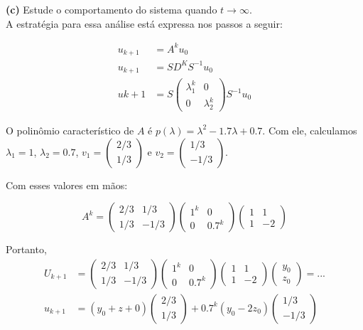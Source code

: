 \documentclass[12pt]{article}
\begin{document}
\textbf{(c)} Estude o comportamento do sistema quando $t\to \infty$.\\

A estratégia para essa análise está expressa nos passos a seguir:

\begin{align*}
	u_{k+1}&=A^ku_0\\
	u_{k+1}&=SD^{K}S^{-1}u_0\\
	u{k+1}&=S\begin{pmatrix}
		\lambda_1^k & 0 \\
		0 & \lambda_2^k
	\end{pmatrix}S^{-1}u_0
\end{align*}

O polinômio característico de $A$ é $p(\lambda)=\lambda^2-1.7\lambda+0.7$. Com ele, calculamos $\lambda_1=1$, $\lambda_2=0.7$, $v_1=\begin{pmatrix}
	2/3 \\
	1/3
\end{pmatrix}$ e $v_2=\begin{pmatrix}
	1/3 \\
	-1/3
\end{pmatrix}$.

Com esses valores em mãos:

\begin{equation*}
	A^k=\begin{pmatrix}
		2/3 & 1/3 \\
		1/3 & -1/3
	\end{pmatrix}
	\begin{pmatrix}
		1^k & 0 \\
		0 & 0.7^k
	\end{pmatrix}
	\begin{pmatrix}
		1 & 1 \\
		1 & -2
	\end{pmatrix}	
\end{equation*}

Portanto,
\begin{align*}
	U_{k+1}&=\begin{pmatrix}
		2/3 & 1/3 \\
		1/3 & -1/3
	\end{pmatrix}
	\begin{pmatrix}
		1^k & 0 \\
		0 & 0.7^k
	\end{pmatrix}
	\begin{pmatrix}
		1 & 1 \\
		1 & -2
	\end{pmatrix}
	\begin{pmatrix}
		y_0 \\
		z_0
	\end{pmatrix}=...\\
	u_{k+1}&=(y_0+z+0)\begin{pmatrix}
		2/3 \\
		1/3
	\end{pmatrix}+0.7^k(y_0-2z_0)\begin{pmatrix}
		1/3 \\
		-1/3
	\end{pmatrix}
\end{align*}
\end{document}
